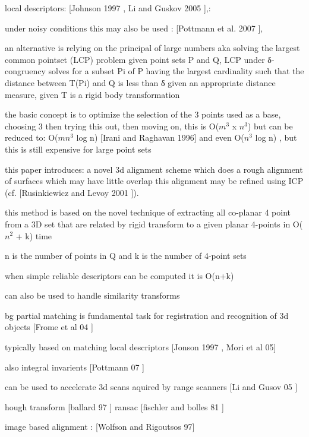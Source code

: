 local descriptors: [Johnson 1997 \cite{Johnson97Spin}, Li
and Guskov 2005 \cite{Li05Multiscale}],: 

under noisy conditions this may also be used : [Pottmann et al. 2007 \cite{Pottmann07Principal}],

an alternative is relying on the principal of large numbers
aka solving the largest common pointset (LCP) problem 
given point sets P and Q, LCP under δ-congruency solves for a subset Pi of P
having the largest cardinality such that the distance between T(Pi) and Q  is less than δ given an appropriate distance measure, given T is a rigid body transformation

the basic concept is to optimize the selection of the 3 points used as a base, choosing 3 then trying this out, then moving on,
this is O($m^3$ x $n^3$) but can be reduced to:  O($mn^3$ log n) [Irani and Raghavan \cite{Irani96Combinatorial} 1996] and even O($n^3$ log n) , but this is still expensive for large point sets

this paper introduces:
a novel 3d alignment scheme which does a rough alignment of surfaces which may have little overlap
this alignment may be refined using ICP  (cf. [Rusinkiewicz and Levoy 2001 \cite{Rusinkiewicz01Efficient}]). 

this method is based on the novel technique of extracting all co-planar 4 point from a 3D set that are related by rigid transform to a given planar 4-points in O($n^2$ + k) time

n is the number of points in Q and k is the number of 4-point sets

when simple reliable descriptors can be computed it is 
O(n+k)

can also be used to handle similarity transforms

bg
partial matching is fundamental task for registration and recognition of 3d objects [Frome et al 04 \cite{Frome04Recognizing}]

typically based on matching local descriptors [Jonson 1997 \cite{Johnson97Spin}, Mori \cite{Mori05Efficient} et al 05]

also integral invarients [Pottmann 07 \cite{Pottmann07Principal}]

can be used to accelerate 3d scans aquired by range scanners [Li and Gusov 05 \cite{Li05Multiscale}]

hough transform [ballard 97 \cite{Ballard81Generalizing}] ransac [fischler and bolles 81 \cite{Fischler81Random}]

image based alignment : [Wolfson and Rigoutsos \cite{Wolfson97Geometric} 97]

